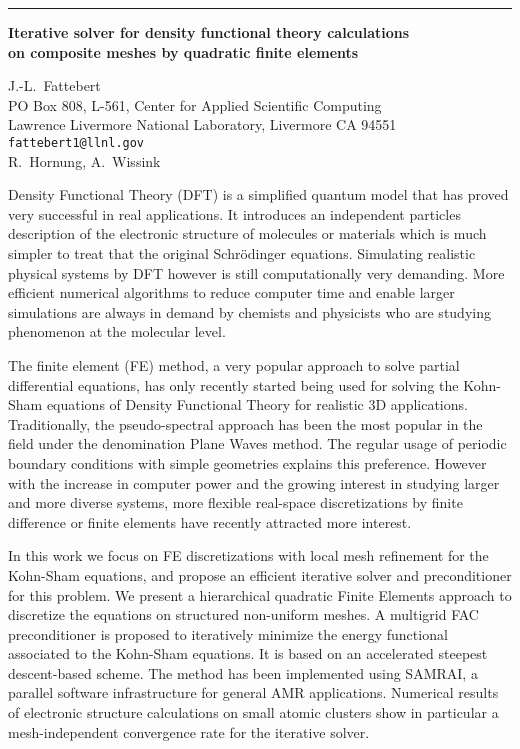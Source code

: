 \documentclass[twosided]{report}
\begin{document}
	\begin{center} \rule{6in}{1pt} \end{center}

\newpage

\begin{center}
{\large			%
{\bf Iterative solver for density functional theory calculations \\
	on composite meshes by quadratic finite elements}}

	J.-L.~Fattebert \\
	PO Box 808, L-561, Center for Applied Scientific Computing \\
	Lawrence Livermore National Laboratory, Livermore CA 94551 \\
	{\tt fattebert1@llnl.gov} \\
	R.~Hornung, A.~Wissink
\end{center}
Density Functional Theory (DFT) is a simplified quantum
model that has proved very successful in real applications.
It introduces an independent particles description of the
electronic structure of molecules or materials which is much
simpler to treat that the original Schr\"{o}dinger equations.
Simulating realistic physical systems by DFT however is
still computationally very demanding. More efficient
numerical algorithms to reduce computer time and enable
larger simulations are always in demand by chemists and
physicists who are studying phenomenon at the molecular
level.

The finite element (FE) method, a very popular
approach to solve partial differential equations, has only
recently started being used for solving the Kohn-Sham
equations of Density Functional Theory for realistic 3D
applications. Traditionally, the pseudo-spectral approach
has been the most popular in the field under the
denomination Plane Waves method. The regular usage of
periodic boundary conditions with simple geometries explains
this preference. However with the increase in computer power
and the growing interest in studying larger and more diverse
systems, more flexible real-space discretizations by finite
difference or finite elements have recently attracted more
interest.

In this work we focus on FE discretizations
with local mesh refinement for the Kohn-Sham equations, and
propose an efficient iterative solver and preconditioner for
this problem. We present a hierarchical quadratic Finite
Elements approach to discretize the equations on structured
non-uniform meshes. A multigrid FAC preconditioner is
proposed to iteratively minimize the energy functional
associated to the Kohn-Sham equations. It is based on an
accelerated steepest descent-based scheme. The method has
been implemented using SAMRAI, a parallel software
infrastructure for general AMR applications. Numerical
results of electronic structure calculations on small atomic
clusters show in particular a mesh-independent convergence
rate for the iterative solver.
\end{document}
